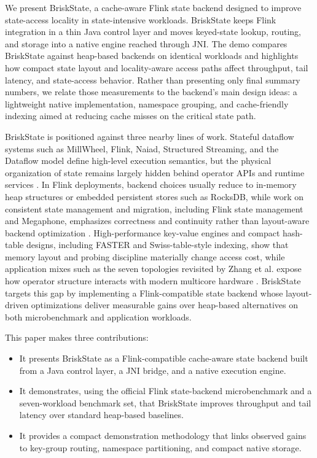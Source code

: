 \documentclass[sigconf,nonacm]{acmart}
\newcommand{\briskstate}{BriskState\xspace}
\begin{document}
We present \briskstate, a cache-aware Flink state backend designed to improve state-access locality in state-intensive workloads. \briskstate keeps Flink integration in a thin Java control layer and moves keyed-state lookup, routing, and storage into a native engine reached through JNI. The demo compares BriskState against heap-based backends on identical workloads and highlights how compact state layout and locality-aware access paths affect throughput, tail latency, and state-access behavior. Rather than presenting only final summary numbers, we relate those measurements to the backend's main design ideas: a lightweight native implementation, namespace grouping, and cache-friendly indexing aimed at reducing cache misses on the critical state path.

\briskstate is positioned against three nearby lines of work. Stateful dataflow systems such as MillWheel, Flink, Naiad, Structured Streaming, and the Dataflow model define high-level execution semantics, but the physical organization of state remains largely hidden behind operator APIs and runtime services \cite{akidau2013millwheel,carbone2015flink,murray2013naiad,armbrust2018structured,akidau2015dataflow}. In Flink deployments, backend choices usually reduce to in-memory heap structures or embedded persistent stores such as RocksDB, while work on consistent state management and migration, including Flink state management and Megaphone, emphasizes correctness and continuity rather than layout-aware backend optimization \cite{carbone2015flink,rocksdb,carbone2017statemanagement,hoffman2019megaphone}. High-performance key-value engines and compact hash-table designs, including FASTER and Swiss-table-style indexing, show that memory layout and probing discipline materially change access cost, while application mixes such as the seven topologies revisited by Zhang et al. expose how operator structure interacts with modern multicore hardware \cite{chandramouli2018faster,abseil2018swisstable,zhang2017revisiting}. \briskstate targets this gap by implementing a Flink-compatible state backend whose layout-driven optimizations deliver measurable gains over heap-based alternatives on both microbenchmark and application workloads.

This paper makes three contributions:
\begin{itemize}
  \item It presents \briskstate as a Flink-compatible cache-aware state backend built from a Java control layer, a JNI bridge, and a native execution engine.
  \item It demonstrates, using the official Flink state-backend microbenchmark and a seven-workload benchmark set, that \briskstate improves throughput and tail latency over standard heap-based baselines.
  \item It provides a compact demonstration methodology that links observed gains to key-group routing, namespace partitioning, and compact native storage.
\end{itemize}
\end{document}

